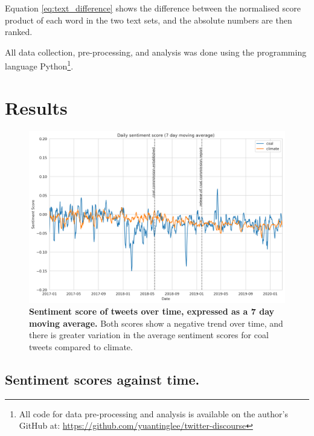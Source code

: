 \documentclass[12pt,onecolumn,twoside]{layout}
\begin{document}
Equation \ref{eq:text_difference} shows the difference between the normalised score product of each word in the two text sets, and the absolute numbers are then ranked.

All data collection, pre-processing, and analysis was done using the programming language Python\footnote{All code for data pre-processing and analysis is available on the author's GitHub at: \href{https://github.com/yuantinglee/twitter-discourse}{https://github.com/yuantinglee/twitter-discourse}}.  

\section{Results} \label{sec:results}

\begin{figure}
	\begin{center}
		\includegraphics[width=\linewidth]{figures/sa_dailyavgsenti_7dma_baseline2}
	\end{center}
	\caption{\textbf{Sentiment score of tweets over time, expressed as a 7 day moving average.} Both scores show a negative trend over time, and there is greater variation in the average sentiment scores for coal tweets compared to climate.}
	\label{fig:tweet_score}
\end{figure}

\subsection*{Sentiment scores against time.}
\end{document}
